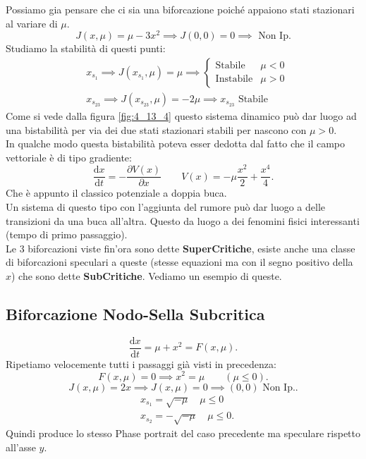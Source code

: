 Possiamo gia pensare che ci sia una biforcazione poiché appaiono stati stazionari al variare di $\mu$.
\[
    J(x, \mu) = \mu-3x^2 \implies  J(0, 0) = 0 \implies  \text{ Non Ip.}
\] 
Studiamo la stabilità di questi punti:
\[\begin{aligned}
    & x_{s_1}\implies J(x_{s_1}, \mu) = \mu  \implies  \begin{cases}
	\text{Stabile} & \mu <0\\
	\text{Instabile} & \mu > 0
    \end{cases}\\
    & x_{s_{23}}\implies J(x_{s_{23}}, \mu) = -2\mu\implies  x_{s_{23}}\text{ Stabile}
\end{aligned}\]
Come si vede dalla figura \ref{fig:4_13_4} questo sistema dinamico può dar luogo ad una bistabilità per via dei due stati stazionari stabili per nascono con $\mu >0$.\\
In qualche modo questa bistabilità poteva esser dedotta dal fatto che il campo vettoriale è di tipo gradiente:
\[
    \frac{\text{d} x}{\text{d} t} = -\frac{\partial V(x) }{\partial x} \qquad  V(x) = - \mu  \frac{x^2}{2} + \frac{x^4}{4}
.\] Che è appunto il classico potenziale a doppia buca.\\
Un sistema di questo tipo con l'aggiunta del rumore può dar luogo a delle transizioni da una buca all'altra. Questo da luogo a dei fenomini fisici interessanti (tempo di primo passaggio).\\
Le 3 biforcazioni viste fin'ora sono dette \textbf{SuperCritiche}, esiste anche una classe di biforcazioni speculari a queste (stesse equazioni ma con il segno positivo della $x$) che sono dette \textbf{SubCritiche}. Vediamo un esempio di queste.
\subsection{Biforcazione Nodo-Sella Subcritica}%
\label{sub:Biforcazione Nodo-Sella Subcritica}
\[
    \frac{\text{d} x}{\text{d} t} = \mu  + x^2 = F(x, \mu) 
.\] 
Ripetiamo velocemente tutti i passaggi già visti in precedenza:
\[
    F(x, \mu) = 0 \implies  x^2 = \mu  \qquad  (\mu\le  0) 
.\] 
\[
    J(x, \mu) = 2x \implies  J(x, \mu) =0 \implies  (0, 0) \text{ Non Ip.}
.\] 
\[\begin{aligned}
    &x_{s_1}= \sqrt{-\mu} \quad  \mu\le 0\\
    &x_{s_2}=-\sqrt{-\mu} \quad  \mu\le 0
.\end{aligned}\]
Quindi produce lo stesso Phase portrait del caso precedente ma speculare rispetto all'asse $y$.
